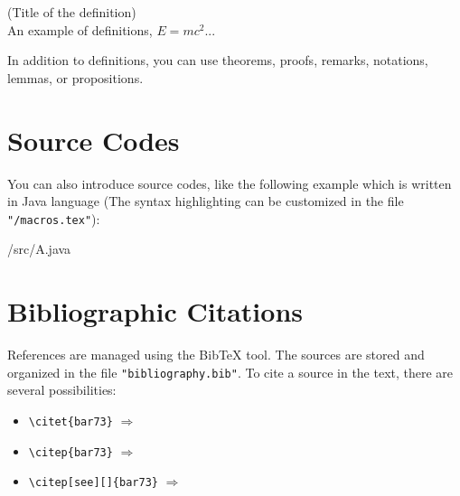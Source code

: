 \begin{definition} \label{def:example}
	(Title of the definition)\\
	An example of definitions, $E=mc^2$...
\end{definition}

In addition to definitions, you can use theorems, proofs, remarks, notations, lemmas, or propositions.

\section{Source Codes}

You can also introduce source codes, like the following example which is written in Java language (The syntax highlighting can be customized in the file \texttt{"/macros.tex"}):

\begin{sourcecode}{/src/A.java}
	
\end{sourcecode}

\section{Bibliographic Citations}

References are managed using the Bib\TeX{} tool. The sources are stored and organized in the file \texttt{"bibliography.bib"}. To cite a source in the text, there are several possibilities:

\begin{itemize}
	\item \verb|\citet{bar73}| \quad $\Rightarrow$ \quad \citet{bar73} %
		\item \verb|\citep{bar73}| \quad $\Rightarrow$ \quad \citep{bar73} %
	\item \verb|\citep[see][]{bar73}| \quad $\Rightarrow$ \quad \citep[see][]{bar73} %
\end{itemize}